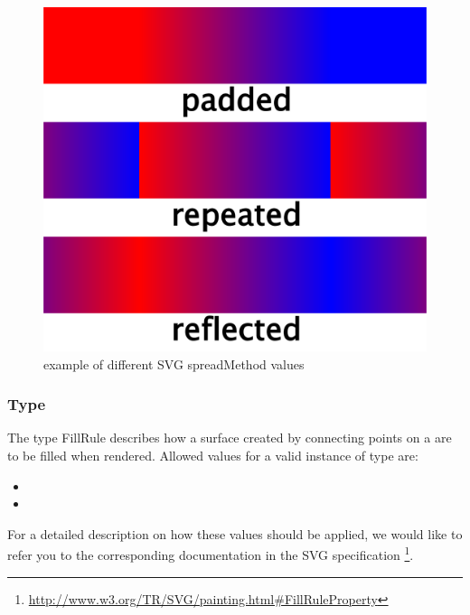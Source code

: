 \begin{figure}[!ht]
\begin{center}
\includegraphics[scale=0.18]{figures/SVG_spreadMethod.png}
\end{center}
\caption{example of different SVG spreadMethod values}
\label{SVG:spreadMethod}
\end{figure}

\subsubsection{Type \fixttspace{}}

The type FillRule describes how a surface created by connecting 
points on a \Polygon are to be filled when rendered. Allowed values for a valid instance of type  are:

\begin{itemize}
 \item {} 
 \item {}
\end{itemize}

For a detailed description on how these values should be applied, we would like to refer you to the corresponding documentation in the SVG specification  \footnote{ \url{http://www.w3.org/TR/SVG/painting.html\#FillRuleProperty} }. 

